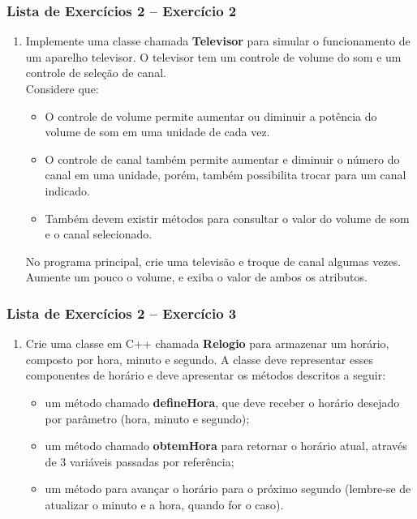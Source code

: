 \documentclass[aspectratio=169]{beamer}
\newcommand\setItemnumber[1]{\setcounter{enumi}{\numexpr#1-1\relax}}
\begin{document}
\begin{frame}\frametitle{Lista de Exercícios 2 -- Exercício 2}
\begin{enumerate}
	\setItemnumber{2}
	\item Implemente uma classe chamada \textbf{Televisor} para simular o funcionamento de um aparelho televisor. O televisor tem um controle de volume do som e um controle de seleção de canal.\\
	Considere que:
	\begin{itemize}
		\item O controle de volume permite aumentar ou diminuir a potência do volume de som em uma unidade de cada vez.
		\item O controle de canal também permite aumentar e diminuir o número do canal em uma unidade, porém, também possibilita trocar para um canal indicado.
		\item Também devem existir métodos para consultar o valor do volume de som e o canal selecionado.
	\end{itemize}
	No programa principal, crie uma televisão e troque de canal algumas vezes. Aumente um pouco o volume, e exiba o valor de ambos os atributos.
\end{enumerate}
\end{frame}

\begin{frame}\frametitle{Lista de Exercícios 2 -- Exercício 3}
\begin{enumerate}
	\setItemnumber{3}
	\item Crie uma classe em C++ chamada \textbf{Relogio} para armazenar um horário, composto por hora, minuto e segundo. A classe deve representar esses componentes de horário e deve apresentar os métodos descritos a seguir:
	\begin{itemize}
		\item um método chamado \textbf{defineHora}, que deve receber o horário desejado por parâmetro (hora, minuto e segundo);
		\item um método chamado \textbf{obtemHora} para retornar o horário atual, através de 3 variáveis passadas por referência;
		\item um método para avançar o horário para o próximo segundo (lembre-se de atualizar o minuto e a hora, quando for o caso).
	\end{itemize}
\end{enumerate}
\end{frame}
\end{document}
